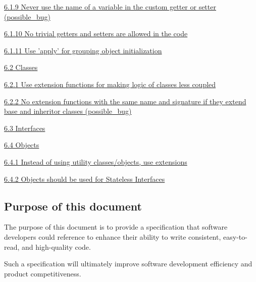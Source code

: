 {{{{{{{{{{{{{{{{\hspace{1.0cm}\hyperref[sec:6.1.9]{ 6.1.9 Never use the name of a variable in the custom getter or setter (possible\_bug)}

\hspace{1.0cm}\hyperref[sec:6.1.10]{ 6.1.10 No trivial getters and setters are allowed in the code}

\hspace{1.0cm}\hyperref[sec:6.1.11]{ 6.1.11 Use 'apply' for grouping object initialization}

\hspace{0.5cm}\hyperref[sec:6.2]{ 6.2 Classes}

\hspace{1.0cm}\hyperref[sec:6.2.1]{ 6.2.1 Use extension functions for making logic of classes less coupled}

\hspace{1.0cm}\hyperref[sec:6.2.2]{ 6.2.2 No extension functions with the same name and signature if they extend base and inheritor classes (possible\_bug)}

\hspace{0.5cm}\hyperref[sec:6.3]{ 6.3 Interfaces}

\hspace{0.5cm}\hyperref[sec:6.4]{ 6.4 Objects}

\hspace{1.0cm}\hyperref[sec:6.4.1]{ 6.4.1 Instead of using utility classes/objects, use extensions}

\hspace{1.0cm}\hyperref[sec:6.4.2]{ 6.4.2 Objects should be used for Stateless Interfaces}

\hspace{0.0cm}\hyperref[sec:]{}

\hspace{0.0cm}\hyperref[sec:]{}

\subsection*{\textbf{Purpose of this document}}

\label{sec:}



The purpose of this document is to provide a specification that software developers could reference to enhance their ability to write consistent, easy-to-read, and high-quality code.

Such a specification will ultimately improve software development efficiency and product competitiveness.

}}}}}}}}}}}}}}}}
